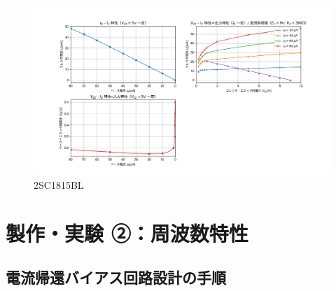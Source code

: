 \documentclass[uplatex,a4paper,11pt,oneside,openany]{jsbook}
\begin{document}
\begin{figure}[H]
    \centering
     \includegraphics[keepaspectratio, scale=0.65, angle=90]
               {figs/png/staticB.png}
               \caption{2SC1815BL}
               \label{fig:b}
\end{figure}

\newpage


\section{製作・実験 ②：周波数特性}


\subsection{電流帰還バイアス回路設計の手順}
\end{document}
